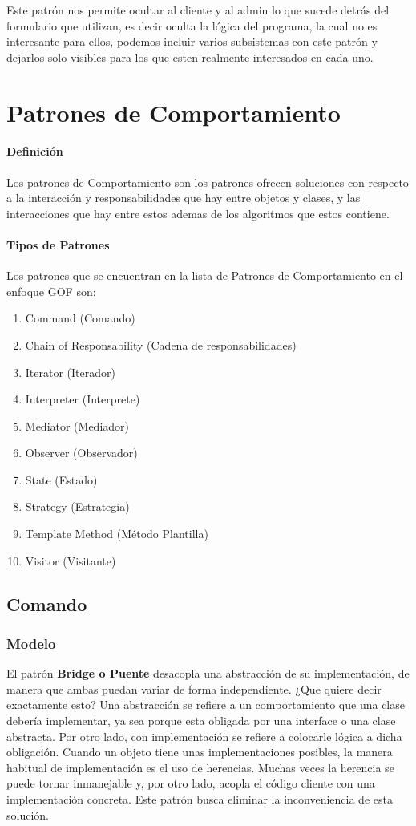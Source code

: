 Este patrón nos permite ocultar al cliente y al admin lo que sucede detrás del formulario que utilizan, es decir oculta la lógica del programa, la cual no es interesante para ellos, podemos incluir varios subsistemas con este patrón y dejarlos solo visibles para los que esten realmente interesados en cada uno. 
\newpage

\section{Patrones de Comportamiento}
\paragraph{Definición}
Los patrones de Comportamiento son los patrones ofrecen soluciones con respecto a la interacción y responsabilidades que hay entre objetos y clases, y las interacciones que hay entre estos ademas de los algoritmos que estos contiene.
\paragraph{Tipos de Patrones}
Los patrones que se encuentran en la lista de Patrones de Comportamiento en el enfoque GOF son:
\begin{enumerate}
	\item Command (Comando)
	\item Chain of Responsability (Cadena de responsabilidades)
	\item Iterator (Iterador)
	\item Interpreter (Interprete)
	\item Mediator (Mediador)
	\item Observer (Observador)
	\item State (Estado)
	\item Strategy (Estrategia)
	\item Template Method (Método Plantilla)
	\item Visitor (Visitante)
\end{enumerate}

\subsection{Comando}
\subsubsection{Modelo}
El patrón \textbf{Bridge o Puente} desacopla una abstracción de su implementación, de manera que ambas puedan variar de forma independiente. ¿Que quiere decir exactamente esto? Una abstracción se refiere a un comportamiento que una clase debería implementar, ya sea porque esta obligada por una interface o una clase abstracta. Por otro lado, con implementación se refiere a colocarle lógica a dicha obligación. Cuando un objeto tiene unas implementaciones posibles, la manera habitual de implementación es el uso de herencias. Muchas veces la herencia se puede tornar inmanejable y, por otro lado, acopla el código cliente con una implementación concreta. Este patrón busca eliminar la inconveniencia de esta solución.

